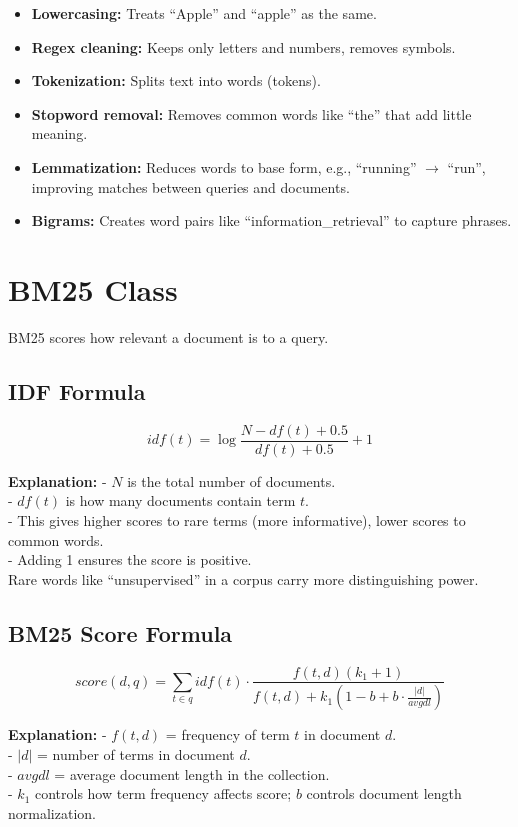 \documentclass[a4paper,12pt]{article}
\begin{document}
\begin{itemize}
    \item \textbf{Lowercasing:} Treats ``Apple'' and ``apple'' as the same.
    \item \textbf{Regex cleaning:} Keeps only letters and numbers, removes symbols.
    \item \textbf{Tokenization:} Splits text into words (tokens).
    \item \textbf{Stopword removal:} Removes common words like ``the'' that add little meaning.
    \item \textbf{Lemmatization:} Reduces words to base form, e.g., ``running'' $\to$ ``run'', improving matches between queries and documents.
    \item \textbf{Bigrams:} Creates word pairs like ``information\_retrieval'' to capture phrases.
\end{itemize}

\section{BM25 Class}
BM25 scores how relevant a document is to a query.

\subsection{IDF Formula}
\[
idf(t) = \log \frac{N - df(t) + 0.5}{df(t) + 0.5} + 1
\]

\textbf{Explanation:}  
- $N$ is the total number of documents. \\
- $df(t)$ is how many documents contain term $t$.  \\
- This gives higher scores to rare terms (more informative), lower scores to common words.  \\
- Adding 1 ensures the score is positive.  \\

Rare words like ``unsupervised'' in a corpus carry more distinguishing power. 

\subsection{BM25 Score Formula}
\[
score(d, q) = \sum_{t \in q} idf(t) \cdot \frac{f(t,d)(k_1 + 1)}{f(t,d) + k_1 \left(1 - b + b \cdot \frac{|d|}{avgdl}\right)}
\]

\textbf{Explanation:}  
- $f(t,d)$ = frequency of term $t$ in document $d$.  \\
- $|d|$ = number of terms in document $d$.  \\
- $avgdl$ = average document length in the collection.  \\
- $k_1$ controls how term frequency affects score; $b$ controls document length normalization.  \\
\end{document}
